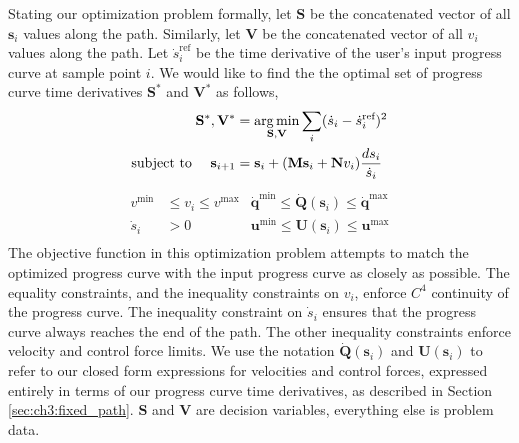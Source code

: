 Stating our optimization problem formally, let $\mathbf{S}$ be the concatenated vector of all $\mathbf{s}_i$ values along the path.
Similarly, let $\mathbf{V}$ be the concatenated vector of all $v_i$ values along the path.
Let $\dot{s}_i^{\text{ref}}$ be the  time derivative of the user's input progress curve at sample point $i$.
We would like to find the the optimal set of progress curve time derivatives $\mathbf{S}^*$ and $\mathbf{V}^*$ as follows, 
%
\begin{equation*}
\begin{aligned}
\mathbf{S}^{*},\mathbf{V}^{*} & = \operatorname*{arg\,min}_{\mathbf{S},\mathbf{V}} \sum_{i} ( \dot{s}_i - \dot{s}_i^{\text{ref}} )^{2} \\
\text{subject to~~~~}
\mathbf{s}_{i+1}              & =    \mathbf{s}_{i} + (\mathbf{M}\mathbf{s}_{i} + \mathbf{N}v_{i}) \frac{ds_i}{\dot{s}_i} \\
\end{aligned}
\end{equation*}
%
\vspace{-5pt}
\begin{equation}
\begin{aligned}
v^{\text{min}}  & \leq v_i \leq v^{\text{max}} & \dot{\mathbf{q}}^{\text{min}}  \leq \dot{\mathbf{Q}}(\mathbf{s}_i) \leq \dot{\mathbf{q}}^{\text{max}} \\
\dot{s}_i       & > 0                          & \mathbf{u}^{\text{min}}          \leq \mathbf{U}(\mathbf{s}_i)       \leq \mathbf{u}^{\text{max}} \\
\end{aligned}
\label{eqn:ch3:s_star_v_star}
\end{equation}
%
The objective function in this optimization problem attempts to match the optimized progress curve with the input progress curve as closely as possible.
The equality constraints, and the inequality constraints on $v_i$, enforce $C^4$ continuity of the progress curve.
The inequality constraint on $\dot{s}_i$ ensures that the progress curve always reaches the end of the path.
The other inequality constraints enforce velocity and control force limits.
We use the notation $\dot{\mathbf{Q}}(\mathbf{s}_i)$ and $\mathbf{U}(\mathbf{s}_i)$ to refer to our closed form expressions for velocities and control forces, expressed entirely in terms of our progress curve time derivatives, as described in Section \ref{sec:ch3:fixed_path}.
$\mathbf{S}$ and $\mathbf{V}$ are decision variables, everything else is problem data.


